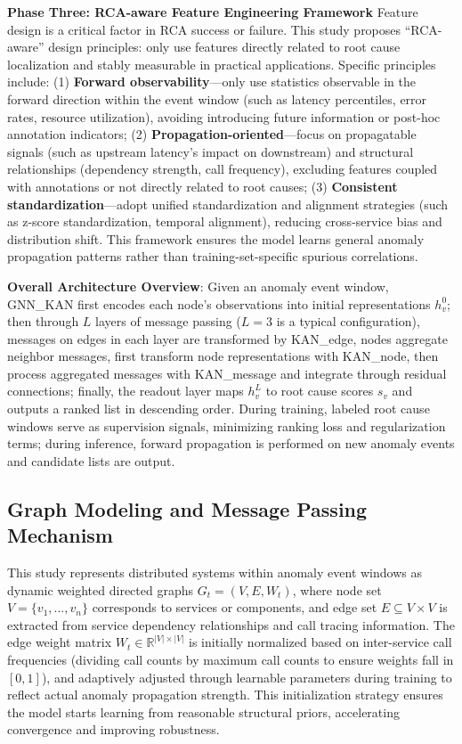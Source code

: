 \documentclass[conference]{IEEEtran}
\begin{document}
\textbf{Phase Three: RCA-aware Feature Engineering Framework}  
Feature design is a critical factor in RCA success or failure. This study proposes ``RCA-aware'' design principles: only use features directly related to root cause localization and stably measurable in practical applications. Specific principles include: (1) \textbf{Forward observability}---only use statistics observable in the forward direction within the event window (such as latency percentiles, error rates, resource utilization), avoiding introducing future information or post-hoc annotation indicators; (2) \textbf{Propagation-oriented}---focus on propagatable signals (such as upstream latency's impact on downstream) and structural relationships (dependency strength, call frequency), excluding features coupled with annotations or not directly related to root causes; (3) \textbf{Consistent standardization}---adopt unified standardization and alignment strategies (such as z-score standardization, temporal alignment), reducing cross-service bias and distribution shift. This framework ensures the model learns general anomaly propagation patterns rather than training-set-specific spurious correlations.

\textbf{Overall Architecture Overview}: Given an anomaly event window, GNN\_KAN first encodes each node's observations into initial representations $h_v^0$; then through $L$ layers of message passing ($L=3$ is a typical configuration), messages on edges in each layer are transformed by KAN\_edge, nodes aggregate neighbor messages, first transform node representations with KAN\_node, then process aggregated messages with KAN\_message and integrate through residual connections; finally, the readout layer maps $h_v^L$ to root cause scores $s_v$ and outputs a ranked list in descending order. During training, labeled root cause windows serve as supervision signals, minimizing ranking loss and regularization terms; during inference, forward propagation is performed on new anomaly events and candidate lists are output.

\subsection{Graph Modeling and Message Passing Mechanism}

This study represents distributed systems within anomaly event windows as dynamic weighted directed graphs $G_t = (V, E, W_t)$, where node set $V = \{v_1, ..., v_n\}$ corresponds to services or components, and edge set $E \subseteq V \times V$ is extracted from service dependency relationships and call tracing information. The edge weight matrix $W_t \in \mathbb{R}^{|V| \times |V|}$ is initially normalized based on inter-service call frequencies (dividing call counts by maximum call counts to ensure weights fall in $[0, 1]$), and adaptively adjusted through learnable parameters during training to reflect actual anomaly propagation strength. This initialization strategy ensures the model starts learning from reasonable structural priors, accelerating convergence and improving robustness.
\end{document}

